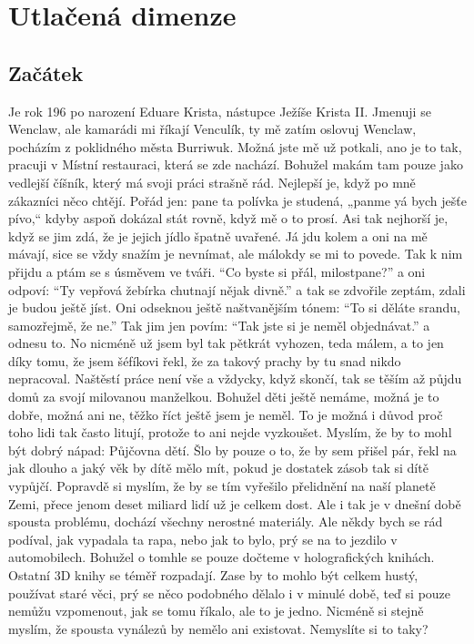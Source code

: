 \part{Utlačená dimenze}


\chapter{Začátek}

Je rok 196 po narození Eduare Krista, nástupce Ježíše Krista II. Jmenuji se Wenclaw, ale kamarádi mi říkají Venculík, ty mě zatím oslovuj Wenclaw, pocházím z poklidného města Burriwuk. Možná jste mě už potkali, ano je to tak, pracuji v Místní restauraci, která se zde nachází. Bohužel makám tam pouze jako vedlejší číšník, který má svoji práci strašně rád. Nejlepší je, když po mně zákazníci něco chtějí. Pořád jen: pane ta polívka je studená, „panme yá bych ješťe pívo,“ kdyby aspoň dokázal stát rovně, když mě o to prosí. Asi tak nejhorší je, když se jim zdá, že je jejich jídlo špatně uvařené. Já jdu kolem a oni na mě mávají, sice se vždy snažím je nevnímat, ale málokdy se mi to povede. Tak k nim přijdu a ptám se s úsměvem ve tváři. “Co byste si přál, milostpane?” a oni odpoví: “Ty vepřová žebírka chutnají nějak divně.” a tak se zdvořile zeptám, zdali je budou ještě jíst. Oni odseknou ještě naštvanějším tónem: “To si děláte srandu, samozřejmě, že ne.” Tak jim jen povím: “Tak jste si je neměl objednávat.” a odnesu to. No nicméně už jsem byl tak pětkrát vyhozen, teda málem, a to jen díky tomu, že jsem šéfíkovi řekl, že za takový prachy by tu snad nikdo nepracoval. Naštěstí práce není vše a vždycky, když skončí, tak se těším až půjdu domů za svojí milovanou manželkou. Bohužel děti ještě nemáme, možná je to dobře, možná ani ne, těžko říct ještě jsem je neměl. To je možná i důvod proč toho lidi tak často litují, protože to ani nejde vyzkoušet. Myslím, že by to mohl být dobrý nápad: Půjčovna dětí. Šlo by pouze o to, že by sem přišel pár, řekl na jak dlouho a jaký věk by dítě mělo mít, pokud je dostatek zásob tak si dítě vypůjčí. Popravdě si myslím, že by se tím vyřešilo přelidnění na naší planetě Zemi, přece jenom deset miliard lidí už je celkem dost. Ale i tak je v dnešní době spousta problému, dochází všechny nerostné materiály. Ale někdy bych se rád podíval, jak vypadala ta rapa, nebo jak to bylo, prý se na to jezdilo v automobilech. Bohužel o tomhle se pouze dočteme v holografických knihách. Ostatní 3D knihy se téměř rozpadají. Zase by to mohlo být celkem hustý, používat staré věci, prý se něco podobného dělalo i v minulé době, teď si pouze nemůžu vzpomenout, jak se tomu říkalo, ale to je jedno. Nicméně si stejně myslím, že spousta vynálezů by nemělo ani existovat. Nemyslíte si to taky?

